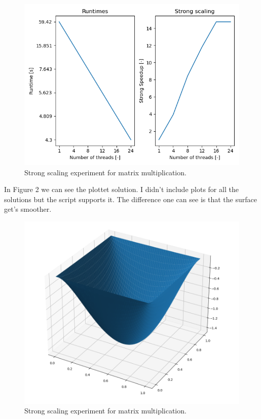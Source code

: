 \documentclass[unicode,11pt,a4paper,oneside,numbers=endperiod,openany]{scrartcl}
\begin{document}
\begin{figure}[H] 
  \centering                                                 
  \includegraphics[width=1\linewidth]{images/problem3.png}                     
  \caption{Strong scaling experiment for matrix multiplication.}                 
\end{figure}

In Figure 2 we can see the plottet solution. I didn't include plots for all
the solutions but the script supports it. The difference one can see is that
the surface get's smoother.

\begin{figure}[H] 
  \centering                                                 
  \includegraphics[width=1\linewidth]{images/solution.png}                     
  \caption{Strong scaling experiment for matrix multiplication.}                 
\end{figure}
\end{document}
